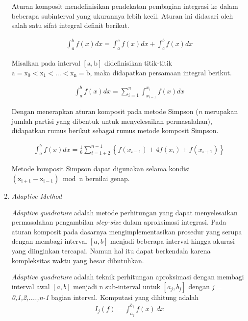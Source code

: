 \documentclass[journal,12pt,onecolumn,a4paper]{IEEEtran}
\begin{document}
\begin{enumerate}
	      Aturan komposit mendefinisikan pendekatan pembagian integrasi ke dalam beberapa subinterval yang ukurannya lebih kecil. Aturan ini didasari oleh salah satu sifat integral definit berikut.

	      \begin{equation*}
		      \begin{split}
			      \int_{a}^{b}f(x)dx=\int_{a}^{c}f(x)dx+\int_{c}^{b}f(x)dx
		      \end{split}
	      \end{equation*}

	      Misalkan pada interval \(\mathrm{[a,b]}\) didefinisikan titik-titik \(\mathrm{a=x_{0}<x_{1}<...<x_{n}=b}\), maka didapatkan persamaan integral berikut.

	      \begin{equation*}
		      \begin{split}
			      \int_{a}^{b}f(x)dx=\sum_{i=1}^{n}\int_{x_{i-1}}^{x_{i}}f(x)dx
		      \end{split}
	      \end{equation*}

	      Dengan menerapkan aturan komposit pada metode Simpson (\emph{n} merupakan jumlah partisi yang dibentuk untuk menyelesaikan permasalahan), didapatkan rumus berikut sebagai rumus metode komposit Simpson.

	      \begin{equation*}
		      \begin{split}
			      \int_{a}^{b}f(x)dx=\frac{1}{6}\sum_{i=1+2}^{n-1}\left \{ f(x_{i-1})+4f(x_{i})+f(x_{i+1}) \right \}
		      \end{split}
	      \end{equation*}

	      Metode komposit Simpson dapat digunakan selama kondisi \(\mathrm{(x_{i+1}-x_{i-1}) \bmod n}\) bernilai genap.

	\item
	      \emph{Adaptive Method}

	      \emph{Adaptive quadrature} adalah metode perhitungan yang dapat menyelesaikan permasalahan pengambilan \emph{step-size} dalam aproksimasi integrasi. Pada aturan komposit pada dasarnya mengimplementasikan prosedur yang serupa dengan membagi interval \([a,b]\) menjadi beberapa interval hingga akurasi yang diinginkan tercapai. Namun hal itu dapat berkendala karena kompleksitas waktu yang besar dibutuhkan.

	      \emph{Adaptive quadrature} adalah teknik perhitungan aproksimasi dengan membagi interval awal \([a,b]\) menjadi n sub-interval untuk \([a_j,b_j]\) dengan \emph{j = 0,1,2,....,n-1} bagian interval. Komputasi yang dihitung adalah
	      \begin{equation*}
		      \begin{split}
			      I_j(f) = \int_{a_j}^{b_j} f(x) \,dx
		      \end{split}
	      \end{equation*}


\end{enumerate}
\end{document}
